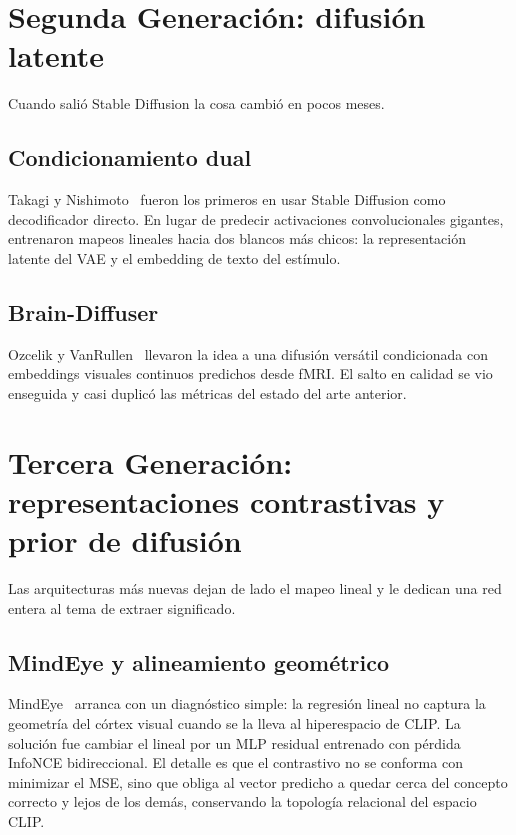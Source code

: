 \section{Segunda Generación: difusión latente}

Cuando salió Stable Diffusion la cosa cambió en pocos meses.

\subsection{Condicionamiento dual}

Takagi y Nishimoto~\cite{takagi2023} fueron los primeros en usar Stable Diffusion
como decodificador directo. En lugar de predecir activaciones convolucionales
gigantes, entrenaron mapeos lineales hacia dos blancos más chicos: la
representación latente del VAE y el embedding de texto del estímulo.

\subsection{Brain-Diffuser}

Ozcelik y VanRullen~\cite{ozcelik2023} llevaron la idea a una difusión versátil condicionada con
embeddings visuales continuos predichos desde fMRI. El salto en calidad se vio enseguida y 
casi duplicó las métricas del estado del arte anterior.

\section{Tercera Generación: representaciones contrastivas y prior de difusión}

Las arquitecturas más nuevas dejan de lado el mapeo lineal y le dedican una
red entera al tema de extraer significado.

\subsection{MindEye y alineamiento geométrico}

MindEye~\cite{scotti2023mindeye} arranca con un diagnóstico simple: la regresión lineal no
captura la geometría del córtex visual cuando se la lleva al hiperespacio de
CLIP. La solución fue cambiar el lineal por un MLP residual entrenado con
pérdida InfoNCE bidireccional. El detalle es que el contrastivo no se conforma
con minimizar el MSE, sino que obliga al vector predicho a quedar cerca del
concepto correcto y lejos de los demás, conservando la topología relacional del
espacio CLIP.

